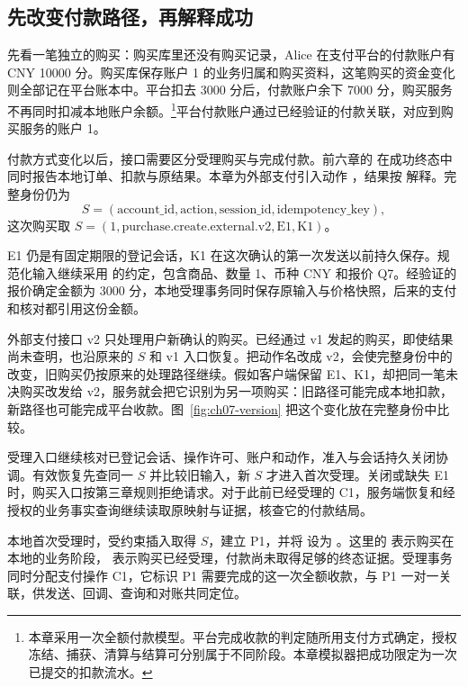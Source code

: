 \subsection*{先改变付款路径，再解释成功}

先看一笔独立的购买：购买库里还没有购买记录，Alice 在支付平台的付款账户有 CNY 10000 分。购买库保存账户 1 的业务归属和购买资料，这笔购买的资金变化则全部记在平台账本中。平台扣去 3000 分后，付款账户余下 7000 分，购买服务不再同时扣减本地账户余额。\footnote{本章采用一次全额付款模型。平台完成收款的判定随所用支付方式确定，授权冻结、捕获、清算与结算可分别属于不同阶段。本章模拟器把成功限定为一次已提交的扣款流水。}平台付款账户通过已经验证的付款关联，对应到购买服务的账户 1。

付款方式变化以后，接口需要区分受理购买与完成付款。前六章的  在成功终态中同时报告本地订单、扣款与原结果。本章为外部支付引入动作 ，结果按  解释。完整身份仍为
\[
 S=(\text{account\_id},\text{action},\text{session\_id},\text{idempotency\_key}),
\]
这次购买取 \(S=(1,\text{purchase.create.external.v2},\text{E1},\text{K1})\)。

E1 仍是有固定期限的登记会话，K1 在这次确认的第一次发送以前持久保存。规范化输入继续采用  的约定，包含商品、数量 1、币种 CNY 和报价 Q7。经验证的报价确定金额为 3000 分，本地受理事务同时保存原输入与价格快照，后来的支付和核对都引用这份金额。

外部支付接口 v2 只处理用户新确认的购买。已经通过 v1 发起的购买，即使结果尚未查明，也沿原来的 \(S\) 和 v1 入口恢复。把动作名改成 v2，会使完整身份中的  改变，旧购买仍按原来的处理路径继续。假如客户端保留 E1、K1，却把同一笔未决购买改发给 v2，服务就会把它识别为另一项购买：旧路径可能完成本地扣款，新路径也可能完成平台收款。图~\ref{fig:ch07-version} 把这个变化放在完整身份中比较。


受理入口继续核对已登记会话、操作许可、账户和动作，准入与会话持久关闭协调。有效恢复先查同一 \(S\) 并比较旧输入，新 \(S\) 才进入首次受理。关闭或缺失 E1 时，购买入口按第三章规则拒绝请求。对于此前已经受理的 C1，服务端恢复和经授权的业务事实查询继续读取原映射与证据，核查它的付款结局。

本地首次受理时，受约束插入取得 \(S\)，建立 P1，并将  设为 。这里的  表示购买在本地的业务阶段， 表示购买已经受理，付款尚未取得足够的终态证据。受理事务同时分配支付操作 C1，它标识 P1 需要完成的这一次全额收款，与 P1 一对一关联，供发送、回调、查询和对账共同定位。

